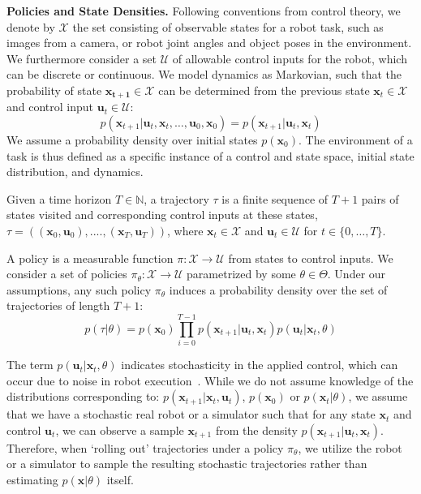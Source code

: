 \documentclass[10pt, conference]{ieeeconf}      %
\newcommand{\bu}{\mathbf{u}}
\newcommand{\bx}{\mathbf{x}}
\begin{document}
\noindent\textbf{Policies and State Densities.}
Following conventions from control theory, we denote by $\mathcal{X}$ the set consisting of observable states for a robot task, such as images from a camera, or robot joint angles and object poses in the environment.
We furthermore consider a set $\mathcal{U}$ of allowable control inputs for the robot, which can be discrete or
continuous. We model dynamics as Markovian, such that the probability of state $\mathbf{x_{t+1}}\in
\mathcal{X}$ can be determined from the previous state $\mathbf{x}_t\in\mathcal{X}$ and control input $\mathbf{u}_t\in
\mathcal{U}$: 
$$p(\bx_{t+1}|\bu_{t},\bx_{t}, \ldots, \bu_{0}, \bx_{0})=p(\bx_{t+1}|\bu_{t}, \bx_t)$$
We assume a probability density over initial states $p(\bx_0)$.
The environment of a task is thus defined as a specific instance of a control and state space, initial state distribution, and dynamics. 



Given a time horizon $T\in \mathbb{N}$, a trajectory $\tau$ is a finite sequence of $T+1$ pairs of states visited and corresponding
control inputs at these states, $\tau = ((\mathbf{x}_0,\mathbf{u}_0), ...., (\mathbf{x}_T,\mathbf{u}_T))$, where $\bx_t\in \mathcal{X}$
and $\bu_t\in \mathcal{U}$ for $t\in \{0, \ldots, T\}$.


A policy is a measurable function $\pi: \mathcal{X} \to \mathcal{U}$ from states to control inputs. 
We consider a set of policies $\pi_{\theta}:\mathcal{X}\to \mathcal{U}$ parametrized by some $\theta\in \Theta$. Under our assumptions, any such policy $\pi_{\theta}$ induces a probability density over the set of  trajectories of length $T+1$: $$p(\tau | \theta)=
p(\bx_0)\prod_{i=0}^{T-1}p(\bx_{t+1}|\bu_t,\bx_t)p(\bu_t|\bx_t,\theta)$$


The term $p(\bu_t|\bx_t,\theta)$ indicates stochasticity in the applied control, which can occur due to noise in robot execution~\cite{mahler2014learning}.
While we do not assume knowledge of the distributions corresponding to: $p(\bx_{t+1}|\bx_t,\bu_t)$, $p(\bx_0)$ or $p(\bx_t|
\theta)$, we assume that we have a stochastic real robot or a simulator such that for any state
$\bx_t$ and control $\bu_t$, we can observe a sample $\bx_{t+1}$ from the density $p(\bx_{t+1}|\bu_t,\bx_t)$. 
Therefore, when `rolling out' trajectories under a policy
$\pi_{\theta}$, we utilize the robot or a simulator to sample the resulting stochastic trajectories rather than
estimating $p(\bx|\theta)$ itself.
\end{document}
